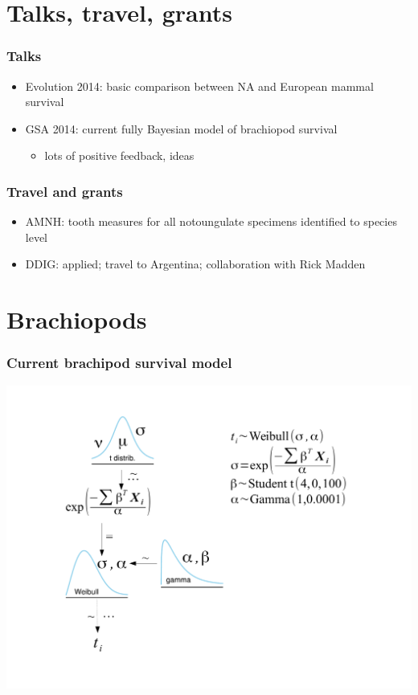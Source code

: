 \documentclass{beamer}
\begin{document}
\begin{frame}
  \tableofcontents
\end{frame}

\section{Talks, travel, grants}
\begin{frame}
  \frametitle{Talks}

  \begin{itemize}
    \item Evolution 2014: basic comparison between NA and European mammal survival 
    \item GSA 2014: current fully Bayesian model of brachiopod survival
      \begin{itemize}
        \item lots of positive feedback, ideas
      \end{itemize}
  \end{itemize}
\end{frame}

\begin{frame}
  \frametitle{Travel and grants}

  \begin{itemize}
    \item AMNH: tooth measures for all notoungulate specimens identified to species level
    \item DDIG: applied; travel to Argentina; collaboration with Rick Madden
  \end{itemize}
\end{frame}


\section{Brachiopods}
\begin{frame}
  \frametitle{Current brachipod survival model}
  \begin{center}
    \includegraphics[height = 0.8\textheight, width = \textwidth,  keepaspectratio = true]{figure/brac_surv_mod}
  \end{center}
\end{frame}
\end{document}
